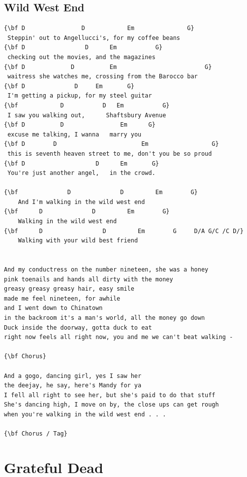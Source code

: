 \documentclass[a4paper]{article}
\begin{document}
\subsection{Wild West End} %
\label{sub:Wild West E}
\begin{Verbatim}[commandchars=\\\{\}]
{\bf D                D            Em               G}
 Steppin' out to Angellucci's, for my coffee beans
{\bf D                 D      Em           G}
 checking out the movies, and the magazines
{\bf D             D          Em                         G}
 waitress she watches me, crossing from the Barocco bar
{\bf D              D     Em       G}
 I'm getting a pickup, for my steel guitar
{\bf            D           D   Em           G}
 I saw you walking out,      Shaftsbury Avenue
{\bf D          D                Em      G}
 excuse me talking, I wanna   marry you
{\bf D        D                        Em                  G}
 this is seventh heaven street to me, don't you be so proud
{\bf D                    D      Em       G}
 You're just another angel,   in the crowd. 

{\bf              D              D         Em        G}
	And I'm walking in the wild west end
{\bf      D              D         Em        G}
	Walking in the wild west end
{\bf      D                 D         Em        G     D/A G/C /C D/}
	Walking with your wild best friend


And my conductress on the number nineteen, she was a honey
pink toenails and hands all dirty with the money
greasy greasy greasy hair, easy smile
made me feel nineteen, for awhile
and I went down to Chinatown
in the backroom it's a man's world, all the money go down
Duck inside the doorway, gotta duck to eat
right now feels all right now, you and me we can't beat walking -

{\bf Chorus}

And a gogo, dancing girl, yes I saw her
the deejay, he say, here's Mandy for ya
I fell all right to see her, but she's paid to do that stuff
She's dancing high, I move on by, the close ups can get rough
when you're walking in the wild west end . . .

{\bf Chorus / Tag}
\end{Verbatim}
\newpage
\section{Grateful Dead} %
\label{sec:Grateful Dead}
\end{document}
